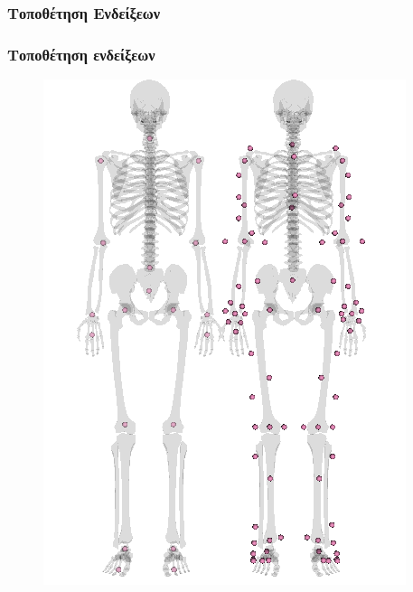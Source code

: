 \documentclass[8pt,sans,mathserif]{beamer}%
\begin{document}
\subsubsection{Τοποθέτηση Ενδείξεων}
\begin{frame}
\frametitle{Τοποθέτηση ενδείξεων}

    \begin{figure}[t]
        \includegraphics[height=0.9\textheight, keepaspectratio]{fig/kinect-vicon-markers.png}
    \end{figure}

\end{frame}
\end{document}
